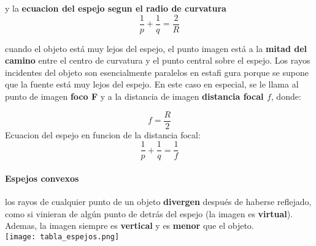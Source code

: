 \documentclass[10pt]{article}
\begin{document}
y la \textbf{ecuacion del espejo segun el radio de curvatura}
\begin{equation*}
	\dfrac{1}{p} + \dfrac{1}{q} = \dfrac{2}{R}
\end{equation*}

cuando el objeto está muy lejos del espejo, el punto imagen está a la \textbf{mitad del camino} entre el centro de curvatura y el punto central sobre el espejo. Los rayos incidentes del objeto son esencialmente paralelos en estafi gura porque se supone que la fuente está muy lejos del espejo. En este caso en especial, se le llama al punto de imagen \textbf{foco F} y a la distancia de imagen \textbf{distancia focal $f$}, donde: 

\begin{equation*}
 f = \dfrac{R}{2}
\end{equation*}
Ecuacion del espejo en funcion de la distancia focal:
\begin{equation*}
	\dfrac{1}{p} + \dfrac{1}{q} = \dfrac{1}{f}
\end{equation*}

\paragraph{Espejos convexos}
los rayos de cualquier punto de un objeto \textbf{divergen} después de haberse reflejado, como si vinieran de algún punto de detrás del espejo (la imagen es \textbf{virtual}). Ademas, la imagen siempre es \textbf{vertical} y es \textbf{menor} que el objeto.\\

\texttt{[image: tabla\_espejos.png]}
\end{document}
